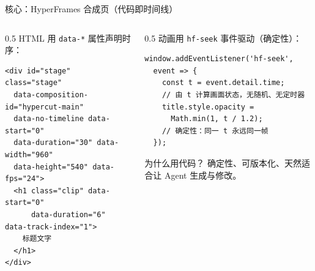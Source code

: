 \documentclass[aspectratio=169,11pt]{beamer}
\begin{document}
\begin{frame}[fragile]{核心：HyperFrames 合成页（代码即时间线）}
  \begin{columns}[T]
    \begin{column}{0.5\textwidth}
      HTML 用 \texttt{data-*} 属性声明时序：
      \lstset{language=HTML, basicstyle=\ttfamily\tiny}
      \begin{lstlisting}
<div id="stage" class="stage"
  data-composition-id="hypercut-main"
  data-no-timeline data-start="0"
  data-duration="30" data-width="960"
  data-height="540" data-fps="24">
  <h1 class="clip" data-start="0"
      data-duration="6" data-track-index="1">
    标题文字
  </h1>
</div>
      \end{lstlisting}
    \end{column}
    \begin{column}{0.5\textwidth}
      动画用 \texttt{hf-seek} 事件驱动（确定性）：
      \lstset{language=JavaScript, basicstyle=\ttfamily\tiny}
      \begin{lstlisting}
window.addEventListener('hf-seek',
  event => {
    const t = event.detail.time;
    // 由 t 计算画面状态，无随机、无定时器
    title.style.opacity =
      Math.min(1, t / 1.2);
    // 确定性：同一 t 永远同一帧
  });
      \end{lstlisting}
      \vspace{0.4em}
      \begin{block}{为什么用代码？}
        确定性、可版本化、天然适合让 Agent 生成与修改。
      \end{block}
    \end{column}
  \end{columns}
\end{frame}
\end{document}
